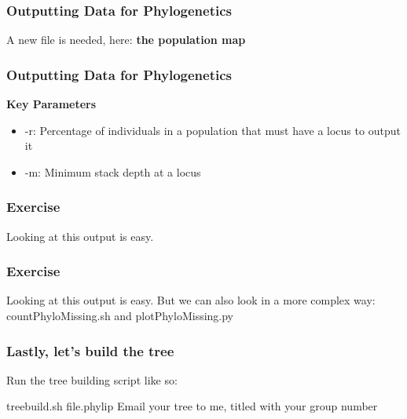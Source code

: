 \documentclass{beamer}
\begin{document}
\begin{frame}
\frametitle{Outputting Data for Phylogenetics}
A new file is needed, here: \textbf{the population map}
\end{frame}

\begin{frame}
\frametitle{Outputting Data for Phylogenetics}
\textbf{Key Parameters}
\begin{itemize}
\item -r: Percentage of individuals in a population that must have a locus to output it
\item -m: Minimum stack depth at a locus
\end{itemize}
\end{frame}

\begin{frame}
\frametitle{Exercise}
Looking at this output is easy.
\end{frame}

\begin{frame}
\frametitle{Exercise}
Looking at this output is easy.
But we can also look in a more complex way: countPhyloMissing.sh and plotPhyloMissing.py
\end{frame}

\begin{frame}
\frametitle{Lastly, let's build the tree}
Run the tree building script like so:

treebuild.sh file.phylip
Email your tree to me, titled with your group number
\end{frame}
\end{document}

